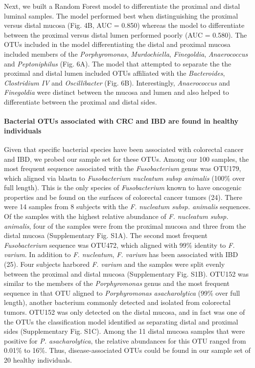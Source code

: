 \documentclass[12pt,]{article}
\let\oldparagraph\paragraph
\renewcommand{\paragraph}[1]{\oldparagraph{#1}\mbox{}}
\begin{document}
Next, we built a Random Forest model to differentiate the proximal and
distal luminal samples. The model performed best when distinguishing the
proximal versus distal mucosa (Fig. 4B, AUC = 0.850) whereas the model
to differentiate between the proximal versus distal lumen performed
poorly (AUC = 0.580). The OTUs included in the model differentiating the
distal and proximal mucosa included members of the \emph{Porphyromonas},
\emph{Murdochiella}, \emph{Finegoldia}, \emph{Anaerococcus} and
\emph{Peptoniphilus} (Fig. 6A). The model that attempted to separate the
the proximal and distal lumen included OTUs affiliated with the
\emph{Bacteroides}, \emph{Clostridium IV} and \emph{Oscillibacter} (Fig.
6B). Interestingly, \emph{Anaerococcus} and \emph{Finegoldia} were
distinct between the mucosa and lumen and also helped to differentiate
between the proximal and distal sides.

\paragraph{Bacterial OTUs associated with CRC and IBD are found in
healthy
individuals}\label{bacterial-otus-associated-with-crc-and-ibd-are-found-in-healthy-individuals}

Given that specific bacterial species have been associated with
colorectal cancer and IBD, we probed our sample set for these OTUs.
Among our 100 samples, the most frequent sequence associated with the
\emph{Fusobacterium} genus was OTU179, which aligned via blastn to
\emph{Fusobacterium nucleatum subsp animalis} (100\% over full length).
This is the only species of \emph{Fusobacterium} known to have oncogenic
properties and be found on the surfaces of colorectal cancer tumors
(24). There were 14 samples from 8 subjects with the \emph{F. nucleatum
subsp. animalis} sequences. Of the samples with the highest relative
abundance of \emph{F. nucleatum subsp. animalis}, four of the samples
were from the proximal mucosa and three from the distal mucosa
(Supplementary Fig. S1A). The second most frequent \emph{Fusobacterium}
sequence was OTU472, which aligned with 99\% identity to \emph{F.
varium}. In addition to \emph{F. nucleatum}, \emph{F. varium} has been
associated with IBD (25). Four subjects harbored \emph{F. varium} and
the samples were split evenly between the proximal and distal mucosa
(Supplementary Fig. S1B). OTU152 was similar to the members of the
\emph{Porphyromonas} genus and the most frequent sequence in that OTU
aligned to \emph{Porphyromonas asacharolytica} (99\% over full length),
another bacterium commonly detected and isolated from colorectal tumors.
OTU152 was only detected on the distal mucosa, and in fact was one of
the OTUs the classification model identified as separating distal and
proximal sides (Supplementary Fig. S1C). Among the 11 distal mucosa
samples that were positive for \emph{P. asacharolytica}, the relative
abundances for this OTU ranged from 0.01\% to 16\%. Thus,
disease-associated OTUs could be found in our sample set of 20 healthy
individuals.
\end{document}

